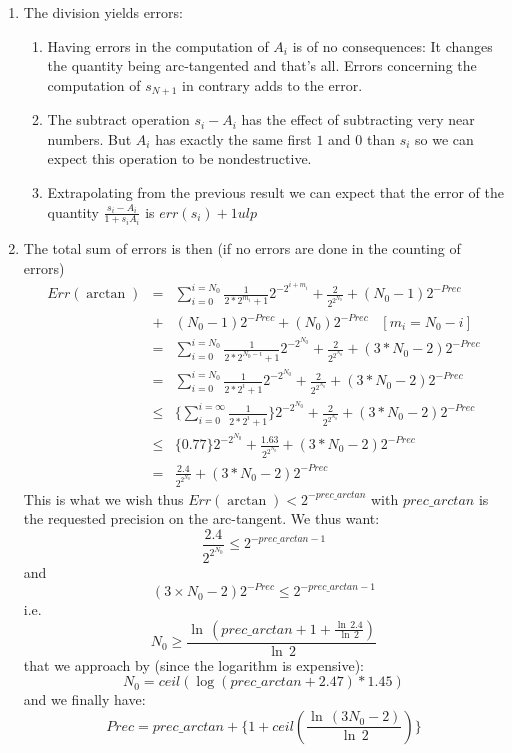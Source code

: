 \documentclass[12pt]{amsart}
\begin{document}
\begin{enumerate}
\item The division yields errors:
\begin{enumerate}
\item Having errors in the computation of $A_i$ is of no consequences: It changes the quantity being arc-tangented and that's all. Errors concerning the computation of $s_{N+1}$ in contrary adds to the error.
\item The subtract operation $s_i-A_i$ has the effect of subtracting very near numbers. But $A_i$ has exactly the same first $1$ and $0$ than $s_i$ so we can expect this operation to be nondestructive.
\item Extrapolating from the previous result we can expect that the error of the quantity $\frac{s_i-A_i}{1+s_iA_i}$ is $err(s_i)+1 ulp$
\end{enumerate}
\item The total sum of errors is then (if no errors are done in the counting of errors)
\begin{eqnarray*}
Err(\arctan)
&=&\sum_{i=0}^{i=N_0}\frac{1}{2*2^{m_i}+1}2^{-2^{i+m_i}}+\frac{2}{2^{2^{N_0}}}+(N_0-1)2^{-Prec}\\
&+&(N_0 -1)2^{-Prec}+(N_0)2^{-Prec}\;\;\;[m_i=N_0-i]\\
&=&\sum_{i=0}^{i=N_0}\frac{1}{2*2^{N_0-i}+1}2^{-2^{N_0}}+\frac{2}{2^{2^{N_0}}}+(3*N_0-2)2^{-Prec}\\
&=&\sum_{i=0}^{i=N_0}\frac{1}{2*2^{i}+1}2^{-2^{N_0}}+\frac{2}{2^{2^{N_0}}}+(3*N_0-2)2^{-Prec}\\
&\leq &\{\sum_{i=0}^{i=\infty}\frac{1}{2*2^{i}+1}\}2^{-2^{N_0}}+\frac{2}{2^{2^{N_0}}}+(3*N_0-2)2^{-Prec}\\
&\leq&\{0.77\}2^{-2^{N_0}}+\frac{1.63}{2^{2^{N_0}}}+(3*N_0-2)2^{-Prec}\\
&=&\frac{2.4}{2^{2^{N_0}}}+(3*N_0-2)2^{-Prec}
\end{eqnarray*}
This is what we wish thus $Err(\arctan)< 2^{-prec\_arctan}$ with $prec\_arctan$
is the requested precision on the arc-tangent.
We thus want:
\[\frac{2.4}{2^{2^{N_0}}}\leq 2^{-prec\_arctan-1}\]
and
\[(3 \times N_0-2)2^{-Prec}\leq 2^{-prec\_arctan-1}\]
i.e.
\[N_0\geq \frac{\ln\,(prec\_arctan+1+\frac{\ln\,2.4}{\ln\,2})}{\ln\,2}\]
that we approach by (since the logarithm is expensive):
\begin{equation*}
N_0=ceil(\log(prec\_arctan+2.47)*1.45)
\end{equation*}
and we finally have:
\begin{equation*}
Prec=prec\_arctan+\{1+ceil(\frac{\ln\,(3N_0-2)}{\ln\,2})\}
\end{equation*}
\end{enumerate}
\end{document}
